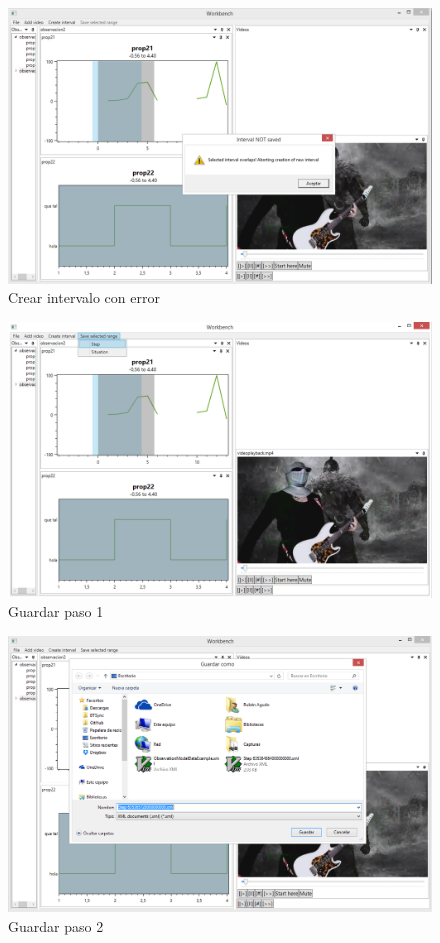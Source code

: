 \begin{figure}[H]
\centering
\includegraphics[width=0.9\linewidth]{./Figures/Capturas/IntervaloCreadoError.PNG}
\caption{Crear intervalo con  error}
\label{fig:CrearIntervaloError}
\end{figure}

\begin{figure}[H]
\centering
\includegraphics[width=0.9\linewidth]{./Figures/Capturas/GuardarPaso1.png}
\caption{Guardar paso 1}
\label{fig:GuardarPaso1}
\end{figure}

\begin{figure}[H]
\centering
\includegraphics[width=0.9\linewidth]{./Figures/Capturas/GuardarPaso2.PNG}
\caption{Guardar paso 2}
\label{fig:GuardarPaso2}
\end{figure}

